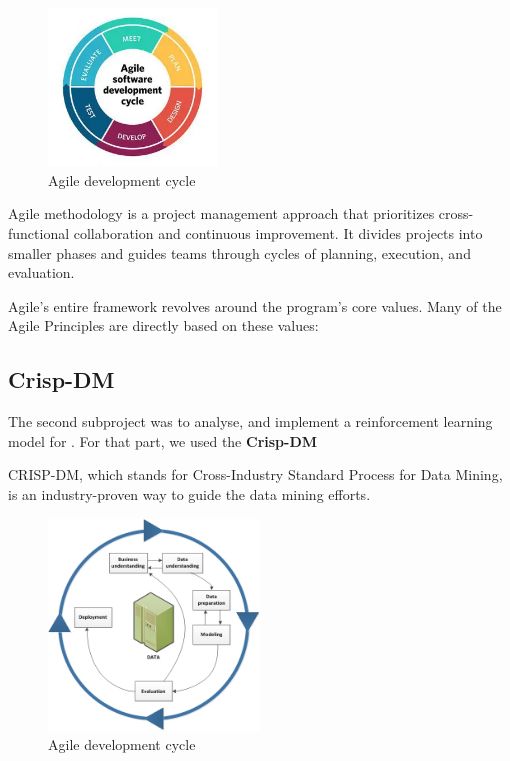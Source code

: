 \begin{figure}[h]
	\centering
	\includegraphics[width=0.4\textwidth]{Figures/Agile.png}
	\caption{Agile development cycle}
\end{figure}
\FloatBarrier

Agile methodology is a project management approach that prioritizes cross-functional collaboration and continuous improvement. It divides projects into smaller phases and guides teams through cycles of planning, execution, and evaluation.

Agile’s entire framework revolves around the program’s core values. Many of the Agile Principles are directly based on these values:
\subsection{Crisp-DM}
The second subproject was to analyse, and implement a reinforcement learning model for . For that part, we used the \textbf{Crisp-DM}

CRISP-DM, which stands for Cross-Industry Standard Process for Data Mining, is an industry-proven way to guide the data mining efforts.

\begin{figure}[h]
	\centering
	\includegraphics[width=0.5\textwidth]{Figures/CRISP_DM.jpg}
	\caption{Agile development cycle}
\end{figure}
\FloatBarrier

